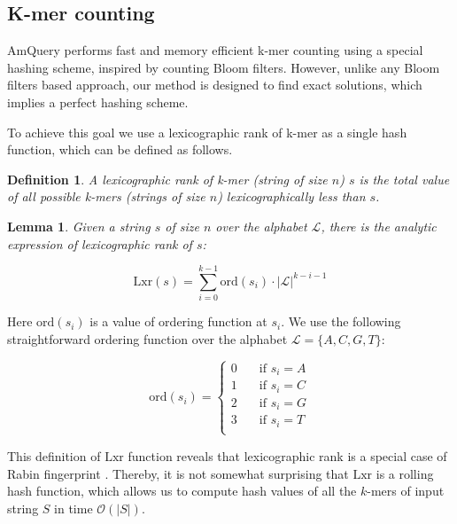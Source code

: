 \documentclass[10pt,letterpaper]{article}
\begin{document}
	\subsection*{K-mer counting}
		AmQuery performs fast and memory efficient k-mer counting using 
		a special hashing scheme, inspired by counting Bloom filters. However, 
		unlike any Bloom filters based approach, our method is designed 
		to find exact solutions, which implies a perfect hashing scheme. 

		To achieve this goal we use a lexicographic rank of 
		k-mer as a single hash function, which can be defined as follows.

		\newtheorem{lxr-def}{Definition}
		\newtheorem{lxr-formula}{Lemma}
		\newtheorem{lxr-rolling}[lxr-formula]{Lemma}

		\begin{lxr-def}
			A lexicographic rank of k-mer (string of size $n$) $s$ is the total value of all 
			possible k-mers (strings of size $n$) lexicographically less than $s$.
		\end{lxr-def}
		
		\begin{lxr-formula}
			Given a string $s$ of size $n$ over the alphabet ${\mathcal{L}}$, there is the analytic expression 
			of lexicographic rank of $s$:

			$$\mathrm{Lxr}(s) = \sum_{i=0}^{k−1} \mathrm{ord}(s_i) \cdot |{\mathcal{L}}|^{k−i−1}$$
		\end{lxr-formula}

		Here $\mathrm{ord}(s_i)$ is a value of ordering function at $s_i$. 
		We use the following straightforward ordering function over the alphabet ${\mathcal{L}} = \{A, C, G, T \}$:

		\[
		 	\mathrm{ord}(s_i) =
			\begin{cases}
				0 & \quad \text{if } s_i = A\\
				1 & \quad \text{if } s_i = C\\
				2 & \quad \text{if } s_i = G\\
				3 & \quad \text{if } s_i = T\\
			\end{cases}
		\]

		This definition of $\mathrm{Lxr}$ function reveals that lexicographic rank is a special case 
		of Rabin fingerprint \cite{rabin1981fingerprinting}.
		Thereby, it is not somewhat surprising that $\mathrm{Lxr}$ is a rolling hash function, which allows us to 
		compute hash values of all the $k$-mers of input string $S$ in time $\mathcal{O}(|S|)$.
		
\end{document}
